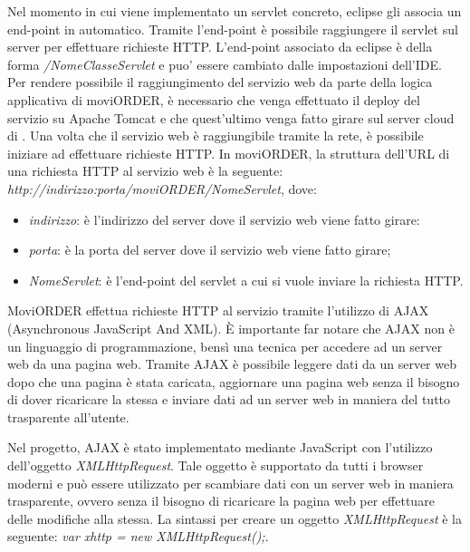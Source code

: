 Nel momento in cui viene implementato un servlet concreto, eclipse gli associa un end-point in automatico. Tramite l'end-point è possibile raggiungere il servlet sul server per effettuare richieste HTTP. L'end-point associato da eclipse è della forma \textit{/NomeClasseServlet} e puo' essere cambiato dalle impostazioni dell'IDE. Per rendere possibile il raggiungimento del servizio web da parte della logica applicativa di moviORDER, è necessario che venga effettuato il deploy del servizio su Apache Tomcat e che quest'ultimo venga fatto girare sul server cloud di \visione{}. Una volta che il servizio web è raggiungibile tramite la rete, è possibile iniziare ad effettuare richieste HTTP. In moviORDER, la struttura dell'URL di una richiesta HTTP al servizio web è la seguente: \textit{http://indirizzo:porta/moviORDER/NomeServlet}, dove:
\begin{itemize}
	\item \textit{indirizzo}: è l'indirizzo del server dove il servizio web viene fatto girare:
	\item \textit{porta}: è la porta del server dove il servizio web viene fatto girare;
	\item \textit{NomeServlet}: è l'end-point del servlet a cui si vuole inviare la richiesta HTTP.
\end{itemize}

MoviORDER effettua richieste HTTP al servizio tramite l'utilizzo di AJAX (Asynchronous JavaScript And XML). È importante far notare che AJAX non è un linguaggio di programmazione, bensì una tecnica per accedere ad un server web da una pagina web. Tramite AJAX è possibile leggere dati da un server web dopo che una pagina è stata caricata, aggiornare una pagina web senza il bisogno di dover ricaricare la stessa e inviare dati ad un server web in maniera del tutto trasparente all'utente. 

Nel progetto, AJAX è stato implementato mediante JavaScript con l'utilizzo dell'oggetto \textit{XMLHttpRequest}. Tale oggetto è supportato da tutti i browser moderni e può essere utilizzato per scambiare dati con un server web in maniera trasparente, ovvero senza il bisogno di ricaricare la pagina web per effettuare delle modifiche alla stessa. La sintassi per creare un oggetto \textit{XMLHttpRequest} è la seguente:
\textit{var xhttp = new XMLHttpRequest();}. 

